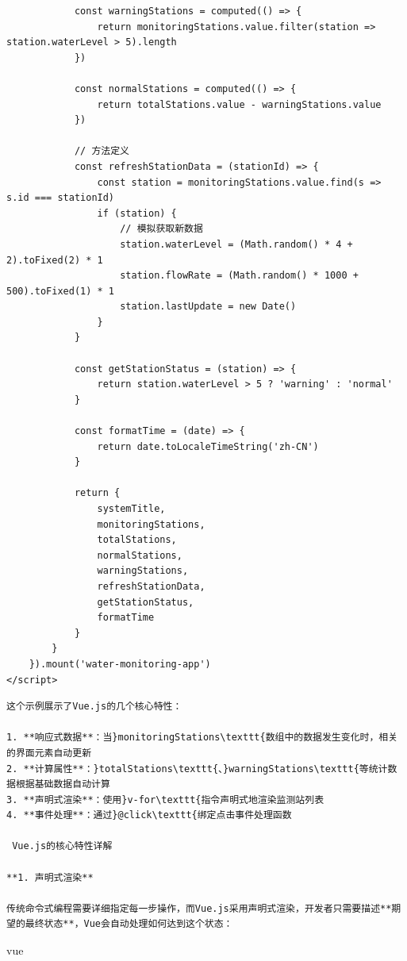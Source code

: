 {{\begin{verbatim}
            const warningStations = computed(() => {
                return monitoringStations.value.filter(station => station.waterLevel > 5).length
            })
            
            const normalStations = computed(() => {
                return totalStations.value - warningStations.value
            })
            
            // 方法定义
            const refreshStationData = (stationId) => {
                const station = monitoringStations.value.find(s => s.id === stationId)
                if (station) {
                    // 模拟获取新数据
                    station.waterLevel = (Math.random() * 4 + 2).toFixed(2) * 1
                    station.flowRate = (Math.random() * 1000 + 500).toFixed(1) * 1
                    station.lastUpdate = new Date()
                }
            }
            
            const getStationStatus = (station) => {
                return station.waterLevel > 5 ? 'warning' : 'normal'
            }
            
            const formatTime = (date) => {
                return date.toLocaleTimeString('zh-CN')
            }
            
            return {
                systemTitle,
                monitoringStations,
                totalStations,
                normalStations,
                warningStations,
                refreshStationData,
                getStationStatus,
                formatTime
            }
        }
    }).mount('water-monitoring-app')
</script>
\end{verbatim}

\begin{lstlisting}
这个示例展示了Vue.js的几个核心特性：

1. **响应式数据**：当}monitoringStations\texttt{数组中的数据发生变化时，相关的界面元素自动更新
2. **计算属性**：}totalStations\texttt{、}warningStations\texttt{等统计数据根据基础数据自动计算
3. **声明式渲染**：使用}v-for\texttt{指令声明式地渲染监测站列表
4. **事件处理**：通过}@click\texttt{绑定点击事件处理函数

 Vue.js的核心特性详解

**1. 声明式渲染**

传统命令式编程需要详细指定每一步操作，而Vue.js采用声明式渲染，开发者只需要描述**期望的最终状态**，Vue会自动处理如何达到这个状态：
\end{lstlisting}

vue

}}
